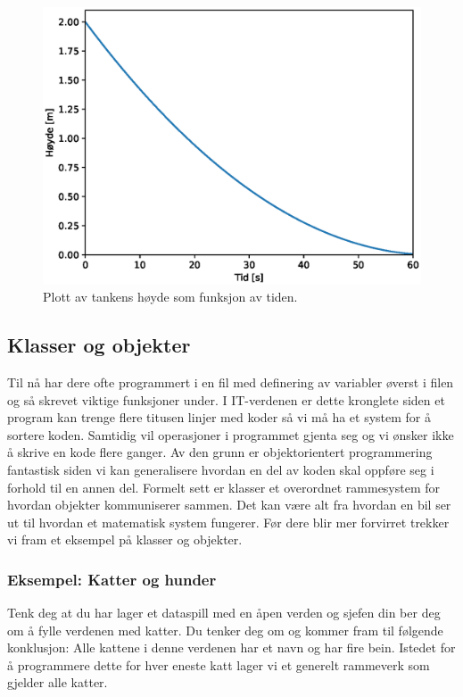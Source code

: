 \begin{figure}[h!]
    \centering
    \includegraphics[scale=0.8]{Text/tank.eps}
    \caption{Plott av tankens høyde som funksjon av tiden.}
    \label{fig:ODE_tank_plot}
\end{figure}

\newpage
\subsection{Klasser og objekter}
Til nå har dere ofte programmert i en fil med definering av variabler øverst i filen og så skrevet viktige funksjoner under. I IT-verdenen er dette kronglete siden et program kan trenge flere titusen linjer med koder så vi må ha et system for å sortere koden. Samtidig vil operasjoner i programmet gjenta seg og vi ønsker ikke å skrive en kode flere ganger. Av den grunn er objektorientert programmering fantastisk siden vi kan generalisere hvordan en del av koden skal oppføre seg i forhold til en annen del. Formelt sett er klasser et overordnet rammesystem for hvordan objekter kommuniserer sammen. Det kan være alt fra hvordan en bil ser ut til hvordan et matematisk system fungerer. Før dere blir mer forvirret trekker vi fram et eksempel på klasser og objekter.

\subsubsection{Eksempel: Katter og hunder}
Tenk deg at du har lager et dataspill med en åpen verden og sjefen din ber deg om å fylle verdenen med katter. Du tenker deg om og kommer fram til følgende konklusjon: Alle kattene i denne verdenen har et navn og har fire bein. Istedet for å programmere dette for hver eneste katt lager vi et generelt rammeverk som gjelder alle katter.

